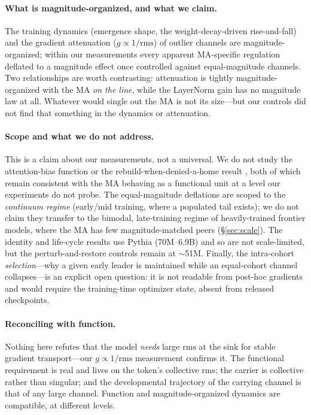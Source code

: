 \documentclass[11pt]{article}
\newcommand{\rms}{\mathrm{rms}}
\begin{document}
\paragraph{What is magnitude-organized, and what we claim.} The training dynamics
(emergence shape, the weight-decay-driven rise-and-fall) and the gradient
attenuation ($g\propto1/\rms$) of outlier channels are magnitude-organized; within
our measurements every apparent MA-specific regulation deflated to a magnitude
effect once controlled against equal-magnitude channels. Two relationships are
worth contrasting: attenuation is tightly magnitude-organized with the MA
\emph{on the line}, while the LayerNorm gain has no magnitude law at all. Whatever
would single out the MA is not its size---but our controls did not find that
something in the dynamics or attenuation.

\paragraph{Scope and what we do not address.} This is a claim about our
measurements, not a universal. We do not study the attention-bias function
\citep{sun2024massive} or the rebuild-when-denied-a-home result \citep{vemula},
both of which remain consistent with the MA behaving as a functional unit at a
level our experiments do not probe. The equal-magnitude deflations are scoped to the
\emph{continuum regime} (early/mid training, where a populated tail exists); we do
not claim they transfer to the bimodal, late-training regime of heavily-trained
frontier models, where the MA has few magnitude-matched peers (\S\ref{sec:scale}).
The identity and life-cycle results use Pythia (70M--6.9B) and so are not
scale-limited, but the perturb-and-restore controls remain at $\sim$51M. Finally, the
intra-cohort \emph{selection}---why a given early leader is maintained while an
equal-cohort channel collapses---is an explicit open question: it is not readable
from post-hoc gradients and would require the training-time optimizer state, absent
from released checkpoints.

\paragraph{Reconciling with function.} Nothing here refutes that the model
\emph{needs} large $\rms$ at the sink for stable gradient transport---our
$g\propto1/\rms$ measurement confirms it. The functional requirement is real and
lives on the token's collective $\rms$; the carrier is collective rather than
singular; and the developmental trajectory of the carrying channel is that of any
large channel. Function and magnitude-organized dynamics are compatible, at
different levels.
\end{document}
